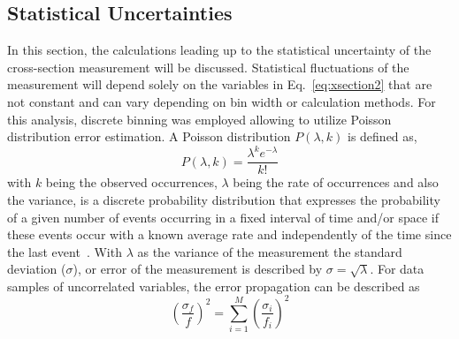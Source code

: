 \subsection{Statistical Uncertainties}\label{sec:results.staterrors}

In this section, the calculations leading up to the statistical uncertainty of the cross-section measurement will be discussed. Statistical fluctuations of the measurement will depend solely on the variables in Eq.~\ref{eq:xsection2} that are not constant and can vary depending on bin width or calculation methods. For this analysis, discrete binning was employed allowing to utilize Poisson distribution error estimation. A Poisson distribution $P(\lambda,k)$ is defined as,
\begin{equation}
P(\lambda,k) = \frac{\lambda^k e^{-\lambda}}{k!}
\end{equation}
with $k$ being the observed occurrences, $\lambda$ being the rate of occurrences and also the variance, is a discrete probability distribution that expresses the probability of a given number of events occurring in a fixed interval of time and/or space if these events occur with a known average rate and independently of the time since the last event~\cite{Poisson}. With $\lambda$ as the variance of the measurement the standard deviation ($\sigma$), or error of the measurement is described by $\sigma = \sqrt{\lambda}$. 
For data samples of uncorrelated variables, the error propagation can be described as
\begin{equation}
\left(\frac{\sigma_f}{f}\right)^2 = \sum_{i=1}^{M}\left(\frac{\sigma_i}{f_i}\right)^2
\end{equation}

